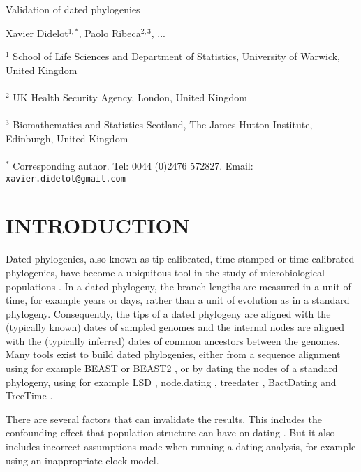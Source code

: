 \documentclass{article}
\begin{document}
{\Large Validation of dated phylogenies}


\vspace*{2cm}
Xavier Didelot$^{1,*}$, Paolo Ribeca$^{2,3}$, ...

\vspace*{2cm}
$^1$ School of Life Sciences and Department of Statistics, University of Warwick, United Kingdom\\\\
$^2$ UK Health Security Agency, London, United Kingdom\\\\
$^3$ Biomathematics and Statistics Scotland, The James Hutton Institute, Edinburgh, United Kingdom\\\\
$^*$ Corresponding author. Tel: 0044 (0)2476 572827. Email: \verb+xavier.didelot@gmail.com+


\newpage
\section*{INTRODUCTION}

Dated phylogenies, also known as tip-calibrated, time-stamped or time-calibrated phylogenies, have become a ubiquitous tool in the study of microbiological populations 
\citep{Drummond2003,Biek2015,rieuxInferencesTipcalibratedPhylogenies2016}. In a dated phylogeny, the branch lengths are measured in a unit of time, for example years or days,
rather than a unit of evolution as in a standard phylogeny. Consequently, the tips of a dated phylogeny are aligned with the (typically known) dates of sampled genomes and
the internal nodes are aligned with the (typically inferred) dates of common ancestors between the genomes.
Many tools exist to build dated phylogenies, either from a sequence alignment using for example BEAST \citep{Suchard2018} or BEAST2 \citep{Bouckaert2019}, or by
dating the nodes of a standard phylogeny, using for example 
LSD \citep{To2016}, node.dating \citep{Jones2017}, treedater \citep{Volz2017}, BactDating \citep{Didelot2018} and TreeTime \citep{Sagulenko2018}.

There are several factors that can invalidate the results.
This includes the confounding effect that population structure can have on dating \citep{Murray2016}.
But it also includes incorrect assumptions made when running a dating analysis, for example using an inappropriate clock model. 
\end{document}
